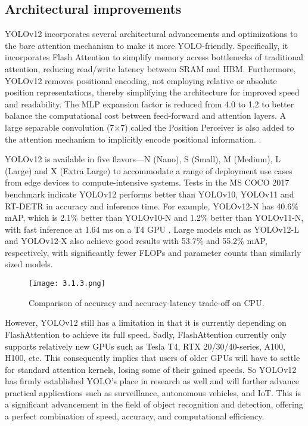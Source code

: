 \documentclass[a4paper,13pt]{report}
\begin{document}
\subsection{Architectural improvements}


YOLOv12 incorporates several architectural advancements and optimizations to the bare attention mechanism to make it more YOLO-friendly. Specifically, it incorporates Flash Attention to simplify memory access bottlenecks of traditional attention, reducing read/write latency between SRAM and HBM. Furthermore, YOLOv12 removes positional encoding, not employing relative or absolute position representations, thereby simplifying the architecture for improved speed and readability. The MLP expansion factor is reduced from 4.0 to 1.2 to better balance the computational cost between feed-forward and attention layers. A large separable convolution (7×7) called the Position Perceiver is also added to the attention mechanism to implicitly encode positional information. \cite{ultralytics2025}.

 YOLOv12 is available in five flavors—N (Nano), S (Small), M (Medium), L (Large) and X (Extra Large) to accommodate a range of deployment use cases from edge devices to compute-intensive systems. Tests in the MS COCO 2017 benchmark indicate YOLOv12 performs better than YOLOv10, YOLOv11 and RT-DETR in accuracy and inference time. For example, YOLOv12-N has 40.6\% mAP, which is 2.1\% better than YOLOv10-N and 1.2\% better than YOLOv11-N, with fast inference at 1.64 ms on a T4 GPU \cite{tian2025}. Large models such as YOLOv12-L and YOLOv12-X also achieve good results with 53.7\% and 55.2\% mAP, respectively, with significantly fewer FLOPs and parameter counts than similarly sized models.

\begin{figure}[h]
  \centering
  \texttt{[image: 3.1.3.png]}
  \caption{Comparison of accuracy and accuracy-latency trade-off on CPU.}
  \label{fig:method}
\end{figure}

However, YOLOv12 still has a limitation in that it is currently depending on FlashAttention to achieve its full speed. Sadly, FlashAttention currently only supports relatively new GPUs such as Tesla T4, RTX 20/30/40-series, A100, H100, etc. This consequently implies that users of older GPUs will have to settle for standard attention kernels, losing some of their gained speeds.
So YOLOv12 has firmly established YOLO's place in research as well and will further advance practical applications such as surveillance, autonomous vehicles, and IoT. This is a significant advancement in the field of object recognition and detection, offering a perfect combination of speed, accuracy, and computational efficiency.
\end{document}
